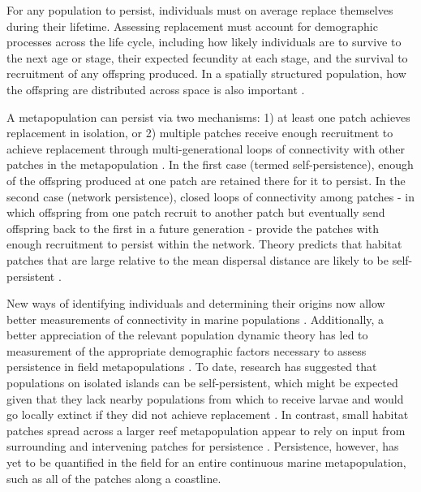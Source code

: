 \documentclass[12pt, oneside]{article}   	%
\begin{document}
For any population to persist, individuals must on average replace themselves during their lifetime. Assessing replacement must account for demographic processes across the life cycle, including how likely individuals are to survive to the next age or stage, their expected fecundity at each stage, and the survival to recruitment of any offspring produced. In a spatially structured population, how the offspring are distributed across space is also important \citep{hastings_persistence_2006}. %

A metapopulation can persist via two mechanisms: 1) at least one patch achieves replacement in isolation, or 2) multiple patches receive enough recruitment to achieve replacement through multi-generational loops of connectivity with other patches in the metapopulation \citep{hastings_persistence_2006, burgess2014beyond}. In the first case (termed self-persistence), enough of the offspring produced at one patch are retained there for it to persist. In the second case (network persistence), closed loops of connectivity among  patches - in which offspring from one patch recruit to another patch but eventually send offspring back to the first in a future generation - provide the patches with enough recruitment to persist within the network. Theory predicts that habitat patches that are large relative to the mean dispersal distance are likely to be self-persistent \citep{white_population_2010}. %

New ways of identifying individuals and determining their origins now allow better measurements of connectivity in marine populations \citep{almany2017larval, daloia_self-recruitment_2013}. Additionally, a better appreciation of the relevant population dynamic theory has led to measurement of the appropriate demographic factors necessary to assess persistence in field metapopulations \citep{carson2011evaluating, hameed2016inverse, johnson2018integrating, salles_coral_2015}. To date, research has suggested that populations on isolated islands can be self-persistent, which might be expected given that they lack nearby populations from which to receive larvae and would go locally extinct if they did not achieve replacement \cite{salles_coral_2015}. In contrast, small habitat patches spread across a larger reef metapopulation appear to rely on input from surrounding and intervening patches for persistence \citep{johnson2018integrating}. Persistence, however, has yet to be quantified in the field for an entire continuous marine metapopulation, such as all of the patches along a coastline. 
\end{document}
